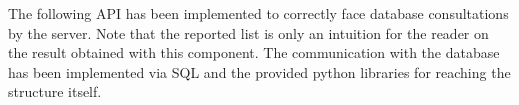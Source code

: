 \medskip
The following API has been implemented to correctly face database consultations by the server. Note that the reported list is only an intuition for the reader on the result obtained with this component. The communication with the database has been implemented via SQL and the provided python libraries for reaching the structure itself.

\vspace{0.5cm}
